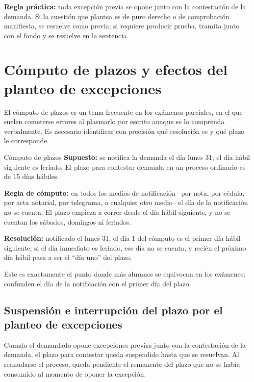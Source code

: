 \documentclass[12pt,oneside]{book}
\begin{document}
\begin{important}
\textbf{Regla práctica:} toda excepción previa se opone junto con la contestación de la demanda. Si la cuestión que plantea es de puro derecho o de comprobación manifiesta, se resuelve como previa; si requiere producir prueba, tramita junto con el fondo y se resuelve en la sentencia.
\end{important}

\section{Cómputo de plazos y efectos del planteo de excepciones}

El cómputo de plazos es un tema frecuente en los exámenes parciales, en el que suelen cometerse errores al plasmarlo por escrito aunque se lo comprenda verbalmente. Es necesario identificar con precisión qué resolución es y qué plazo le corresponde.

\begin{exercise}{Cómputo de plazos}
\textbf{Supuesto:} se notifica la demanda el día lunes 31; el día hábil siguiente es feriado. El plazo para contestar demanda en un proceso ordinario es de 15 días hábiles.

\textbf{Regla de cómputo:} en todos los medios de notificación --por nota, por cédula, por acta notarial, por telegrama, o cualquier otro medio-- el día de la notificación no se cuenta. El plazo empieza a correr desde el día hábil siguiente, y no se cuentan los sábados, domingos ni feriados.

\textbf{Resolución:} notificado el lunes 31, el día 1 del cómputo es el primer día hábil siguiente; si el día inmediato es feriado, ese día no se cuenta, y recién el próximo día hábil pasa a ser el ``día uno'' del plazo.
\end{exercise}

\begin{note}
Este es exactamente el punto donde más alumnos se equivocan en los exámenes: confunden el día de la notificación con el primer día del plazo.
\end{note}

\subsection*{Suspensión e interrupción del plazo por el planteo de excepciones}

Cuando el demandado opone excepciones previas junto con la contestación de la demanda, el plazo para contestar queda suspendido hasta que se resuelvan. Al reanudarse el proceso, queda pendiente el remanente del plazo que no se había consumido al momento de oponer la excepción.
\end{document}
